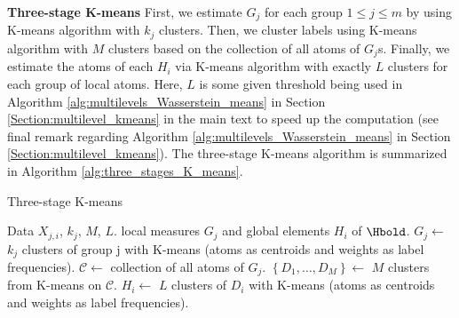 \textbf{Three-stage K-means}
First, we estimate $G_j$ for each group $1 \leq j \leq m$ by using K-means 
algorithm with $k_{j}$ clusters.
Then, we cluster labels using K-means algorithm with $M$ clusters based on the collection of  all atoms of $G_j$s.
Finally, we estimate the atoms of each $H_i$ via K-means algorithm with exactly $L$ clusters for each 
group of local atoms. Here, $L$ is some given threshold being used in Algorithm \ref{alg:multilevels_Wasserstein_means} in 
Section \ref{Section:multilevel_kmeans} in the main text to speed up the computation (see final remark regarding Algorithm \ref{alg:multilevels_Wasserstein_means} in Section \ref{Section:multilevel_kmeans}). 
The three-stage K-means algorithm is summarized in Algorithm \ref{alg:three_stages_K_means}.
\setcounter{algorithm}{2}
\begin{algorithm}
   \caption{Three-stage K-means}
   \label{alg:three_stages_K_means}
\begin{algorithmic}
    Data $X_{j,i}$, $k_{j}$, $M$, $L$.
    local measures $G_{j}$ and global elements $H_{i}$ of $\Hbold$.
   \STATE $G_{j} \leftarrow$ $k_{j}$ clusters of group j with K-means (atoms as centroids and weights as label frequencies).
   \ENDFOR
   	\STATE $\mathcal{C} \leftarrow$ collection of all atoms of $G_{j}$.
   	\STATE $\left\{D_{1},\ldots,D_{M}\right\} \leftarrow$ $M$ clusters from K-means on $\mathcal{C}$.
   \STATE $H_i \leftarrow$ $L$ clusters of $D_i$ with K-means (atoms as centroids and weights as label frequencies).
   \ENDFOR 
\end{algorithmic}
\end{algorithm}

